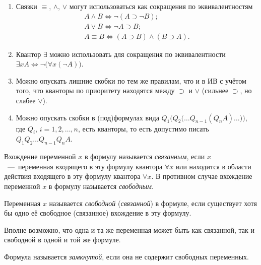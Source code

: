 \begin{remark*}\leavevmode
    \begin{enumerate}
        \item Связки $\equiv$, $\land$, $\lor$ могут использоваться как сокращения по эквивалентностям
        \begin{gather*}
            A \land B \Longleftrightarrow \neg(A \supset \neg B); \\
            A \lor B \Longleftrightarrow \neg A \supset B; \\
            A \equiv B \Longleftrightarrow (A \supset B)\land(B \supset A).
        \end{gather*}

        \item Квантор $\exists$ можно использовать для сокращения по эквивалентности $\exists xA \Longleftrightarrow \neg\big(\forall x(\neg A)\big)$.

        \item Можно опускать лишние скобки по тем же правилам, что и в ИВ с учётом того, что кванторы по приоритету находятся между $\supset$ и $\lor$ (сильнее $\supset$, но слабее $\lor$).

        \item Можно опускать скобки в (под)формулах вида $Q_1\Big(Q_2\big(\dots Q_{n - 1}(Q_nA)\dots\big)\Big)$, где $Q_i$, $i = 1, 2, \dots, n$, есть кванторы, то есть допустимо писать $Q_1Q_2\dots Q_{n - 1}Q_nA$.
    \end{enumerate}
\end{remark*}

\begin{definition*}
    Вхождение переменной $x$ в формулу называется \textit{связанным}, если $x$~---~переменная входящего в эту формулу квантора $\forall x$ или находится в области действия входящего в эту формулу квантора $\forall x$. В противном случае вхождение переменной $x$ в формулу называется \textit{свободным}.
\end{definition*}

\begin{definition*}
    Переменная $x$ называется \textit{свободной} (\textit{связанной}) в формуле, если существует хотя бы одно её свободное (связанное) вхождение в эту формулу.
\end{definition*}
Вполне возможно, что одна и та же переменная может быть как связанной, так и свободной в одной и той же формуле.

\begin{definition*}
    Формула называется \textit{замкнутой}, если она не содержит свободных переменных.
\end{definition*}